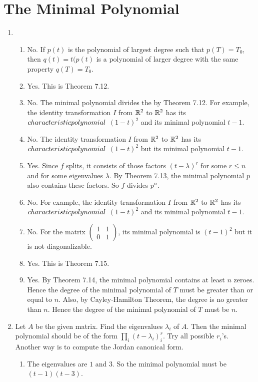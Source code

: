 \section{The Minimal Polynomial}
\begin{enumerate}
\item \begin{enumerate}
\item No. If $p(t)$ is the polynomial of largest degree such that $p(T)=T_0$, then $q(t)=t(p(t)$ is a polynomial of larger degree with the same property $q(T)=T_0$.
\item Yes. This is Theorem 7.12.
\item No. The minimal polynomial divides the \charpoly{} by Theorem 7.12. For example, the identity transformation $I$ from $\mathbb{R}^2$ to $\mathbb{R}^2$ has its $characteristic polynomial{}$ $(1-t)^2$ and its minimal polynomial $t-1$.
\item No. The identity transformation $I$ from $\mathbb{R}^2$ to $\mathbb{R}^2$ has its $characteristic polynomial{}$ $(1-t)^2$ but its minimal polynomial $t-1$.
\item Yes. Since $f$ splits, it consists of those factors $(t-\lambda)^r$ for some $r\leq n$ and for some eigenvalues $\lambda $. By Theorem 7.13, the minimal polynomial $p$ also contains these factors. So $f$ divides $p^n$.
\item No. For example, the identity transformation $I$ from $\mathbb{R}^2$ to $\mathbb{R}^2$ has its $characteristic polynomial{}$ $(1-t)^2$ and its minimal polynomial $t-1$.
\item No. For the matrix $\begin{pmatrix}1&1\\0&1\end{pmatrix}$, its minimal polynomial is $(t-1)^2$ but it is not diagonalizable.
\item Yes. This is Theorem 7.15.
\item Yes. By Theorem 7.14, the minimal polynomial contains at least $n$ zeroes. Hence the degree of the minimal polynomial of $T$ must be greater than or equal to $n$. Also, by Cayley-Hamilton Theorem, the degree is no greater than $n$. Hence the degree of the minimal polynomial of $T$ must be $n$.
\end{enumerate}
\item Let $A$ be the given matrix. Find the eigenvalues $\lambda_i$ of $A$. Then the minimal polynomial should be of the form $\prod_i(t-\lambda_i)^r_i$. Try all possible $r_i$'s. Another way is to compute the Jordan canonical form.
\begin{enumerate}
\item The eigenvalues are $1$ and $3$. So the minimal polynomial must be $(t-1)(t-3)$.

\end{enumerate}
\end{enumerate}
